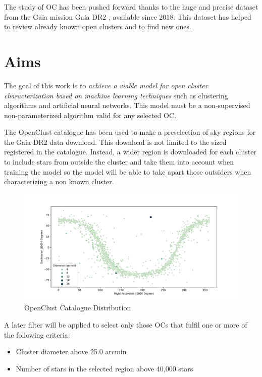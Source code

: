 \documentclass[11pt, a4paper, english]{book}
\begin{document}
The study of OC has been pushed forward thanks to the huge and precise dataset from the Gaia mission
\cite{collaboration2016description} Gaia DR2 \cite{gaia2018gaia}, available since 2018.
This dataset has helped to review already known open clusters and to find new ones.

\section{Aims}

The goal of this work is to \emph{achieve a viable model for open cluster characterization based on machine learning techniques}
such as clustering algorithms and artificial neural networks.
This model must be a non-supervised non-parameterized algorithm valid for any selected OC.

The OpenClust catalogue \cite{dias2002new} has been used to make a preselection of sky regions for the Gaia DR2 data download.
This download is not limited to the sized registered in the catalogue. Instead, a wider region is downloaded for each cluster to include
stars from outside the cluster and take them into account when training the model so the model will be able to take apart those outsiders
when characterizing a non known cluster.

\begin{figure}[htbp]
  \centering
  \includegraphics[width=\columnwidth]{../figures/openclust_catalogue.pdf}
  \caption{OpenClust Catalogue Distribution}
\end{figure}

A later filter will be applied to select only those OCs that fulfil one or more of the following criteria:

\begin{itemize}
  \item Cluster diameter above 25.0 arcmin
  \item Number of stars in the selected region above 40,000 stars
\end{itemize}
\end{document}
